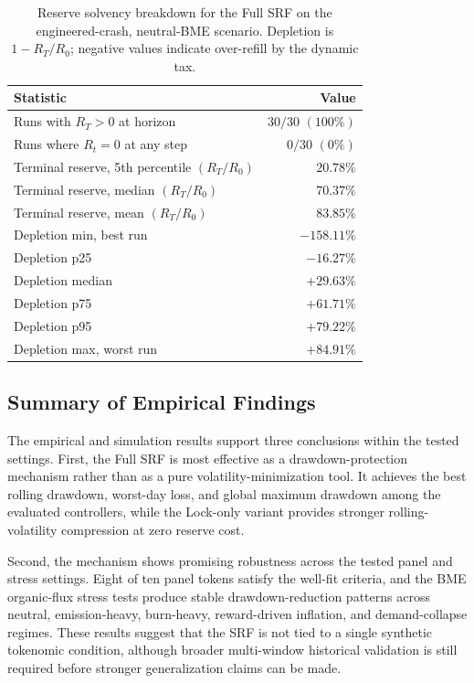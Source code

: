 \documentclass[a4paper,fleqn]{cas-dc}
\begin{document}
\begin{table}[htbp]
\centering
\caption{Reserve solvency breakdown for the Full SRF on the engineered-crash, neutral-BME scenario. Depletion is \(1-R_T/R_0\); negative values indicate over-refill by the dynamic tax.}
\label{tab:reserve_solvency}
\begin{tabular}{|l|r|}
\hline
\textbf{Statistic} & \textbf{Value} \\
\hline
Runs with \(R_T>0\) at horizon & \(30/30\) \((100\%)\) \\
\hline
Runs where \(R_t=0\) at any step & \(0/30\) \((0\%)\) \\
\hline
Terminal reserve, 5th percentile \((R_T/R_0)\) & \(20.78\%\) \\
\hline
Terminal reserve, median \((R_T/R_0)\) & \(70.37\%\) \\
\hline
Terminal reserve, mean \((R_T/R_0)\) & \(83.85\%\) \\
\hline
Depletion min, best run & \(-158.11\%\) \\
\hline
Depletion p25 & \(-16.27\%\) \\
\hline
Depletion median & \(+29.63\%\) \\
\hline
Depletion p75 & \(+61.71\%\) \\
\hline
Depletion p95 & \(+79.22\%\) \\
\hline
Depletion max, worst run & \(+84.91\%\) \\
\hline
\end{tabular}
\end{table}

\subsection{Summary of Empirical Findings}
\label{sec:exp-summary}

The empirical and simulation results support three conclusions within the tested settings. First, the Full SRF is most effective as a drawdown-protection mechanism rather than as a pure volatility-minimization tool. It achieves the best rolling drawdown, worst-day loss, and global maximum drawdown among the evaluated controllers, while the Lock-only variant provides stronger rolling-volatility compression at zero reserve cost.

Second, the mechanism shows promising robustness across the tested panel and stress settings. Eight of ten panel tokens satisfy the well-fit criteria, and the BME organic-flux stress tests produce stable drawdown-reduction patterns across neutral, emission-heavy, burn-heavy, reward-driven inflation, and demand-collapse regimes. These results suggest that the SRF is not tied to a single synthetic tokenomic condition, although broader multi-window historical validation is still required before stronger generalization claims can be made.
\end{document}
